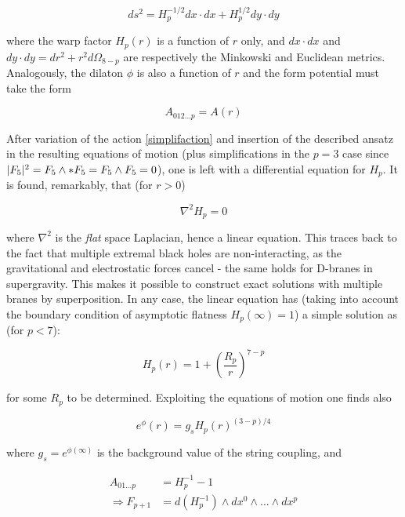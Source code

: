 \begin{equation}
	ds^2 = H_p^{-1/2} dx \cdot dx + H_p^{1/2} dy \cdot dy
	\label{}
\end{equation}

where the warp factor $H_p(r)$ is a function of $r$ only, and $dx \cdot dx$ and $dy \cdot dy = dr^2 + r^2 d\Omega_{8-p}$ are respectively the Minkowski and Euclidean metrics. Analogously, the dilaton $\phi$ is also a function of $r$ and the form potential must take the form

\begin{equation}
	A_{012\ldots p} = A(r)
	\label{}
\end{equation}

After variation of the action \eqref{simplifaction} and insertion of the described ansatz in the resulting equations of motion (plus simplifications in the $p=3$ case since $|F_5|^2 = F_5 \wedge \ast F_5 = F_5 \wedge F_5 = 0$), one is left with a differential equation for $H_p$. It is found, remarkably, that (for $r>0$)

\begin{equation}
	\nabla^2 H_p = 0
	\label{}
\end{equation}

where $\nabla^2$ is the \emph{flat} space Laplacian, hence a linear equation. This traces back to the fact that multiple extremal black holes are non-interacting, as the gravitational and electrostatic forces cancel - the same holds for D-branes in supergravity. This makes it possible to construct exact solutions with multiple branes by superposition. In any case, the linear equation has (taking into account the boundary condition of asymptotic flatness $H_p(\infty) = 1$) a simple solution as (for $p<7$):

\begin{equation}
	H_p(r) = 1 + \left( \frac{R_p}{r} \right)^{7-p}
	\label{warppbrane}
\end{equation}

for some $R_p$ to be determined. Exploiting the equations of motion one finds also

\begin{equation}
	e^\phi(r) = g_s H_p(r)^{(3-p)/4}
	\label{dilatonpbrane}
\end{equation}

where $g_s = e^{\phi(\infty)}$ is the background value of the string coupling, and

\begin{align}
	A_{01\ldots p} &= H_p^{-1} - 1  \\\Rightarrow
	F_{p+1} &= d(H_p^{-1}) \wedge dx^0 \wedge \ldots \wedge dx^p
	\label{}
\end{align}

